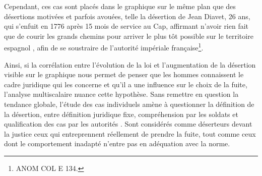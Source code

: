 \documentclass[final, fra]{anthology-ch}     %
\begin{document}

Cependant, ces cas sont placés dans le graphique sur le même plan que des désertions motivées et parfois avouées, telle la désertion de Jean Diavet, 26 ans, qui s'enfuit en 1776 après 15 mois de service au Cap, affirmant \og n'avoir rien fait que de courir les grands chemins pour arriver le plus tôt possible sur le territoire espagnol \fg{}, afin de se soustraire de l'autorité impériale française\footnote{ANOM COL E 134.}.

Ainsi, si la corrélation entre l'évolution de la loi et l'augmentation de la désertion visible sur le graphique nous permet de penser que les hommes connaissent le cadre juridique qui les concerne et qu'il a une influence sur le choix de la fuite, l'analyse multiscalaire nuance cette hypothèse. Sans remettre en question la tendance globale, l'étude des cas individuels amène à questionner la définition de la désertion, entre définition juridique fixe, compréhension par les soldats et qualification des cas par les autorités \cite{bascoul-colloque-angers}. Sont considérés comme déserteurs devant la justice ceux qui entreprennent réellement de prendre la fuite, tout comme ceux dont le comportement inadapté n'entre pas en adéquation avec la norme.

\end{document}
